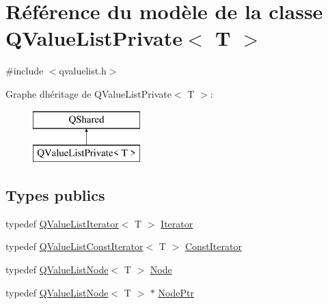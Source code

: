 \hypertarget{class_q_value_list_private}{}\section{Référence du modèle de la classe Q\+Value\+List\+Private$<$ T $>$}
\label{class_q_value_list_private}


{\ttfamily \#include $<$qvaluelist.\+h$>$}

Graphe d\textquotesingle{}héritage de Q\+Value\+List\+Private$<$ T $>$\+:\begin{figure}[H]
\begin{center}
\leavevmode
\includegraphics[height=2.000000cm]{class_q_value_list_private}
\end{center}
\end{figure}
\subsection*{Types publics}
\begin{DoxyCompactItemize}
\item 
typedef \hyperlink{class_q_value_list_iterator}{Q\+Value\+List\+Iterator}$<$ T $>$ \hyperlink{class_q_value_list_private_aef9e14569c19defeaa2b6c8e636fafde}{Iterator}
\item 
typedef \hyperlink{class_q_value_list_const_iterator}{Q\+Value\+List\+Const\+Iterator}$<$ T $>$ \hyperlink{class_q_value_list_private_aeaccf04652d772f634ba78357a915b5c}{Const\+Iterator}
\item 
typedef \hyperlink{class_q_value_list_node}{Q\+Value\+List\+Node}$<$ T $>$ \hyperlink{class_q_value_list_private_a70ca1830018ed991cbd8d957ff62d10a}{Node}
\item 
typedef \hyperlink{class_q_value_list_node}{Q\+Value\+List\+Node}$<$ T $>$ $\ast$ \hyperlink{class_q_value_list_private_a63f9e5099e8c8445e00af7e3f4d7e274}{Node\+Ptr}
\end{DoxyCompactItemize}
